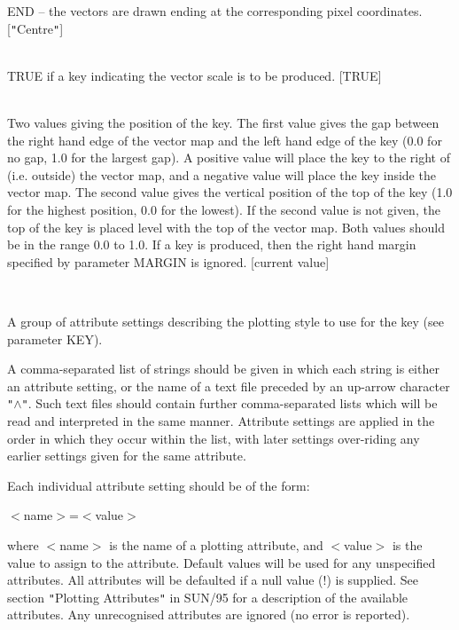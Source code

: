 \documentclass[twoside,11pt]{article}
\renewcommand{\_}{\texttt{\symbol{95}}}
\newcommand{\sstsubsection}[1]{ \item[{#1}] \mbox{} \\}
\newcommand{\sstitem}{\item}
\newcommand{\sstsubsection}[1]{\item[{#1}]}
\newcommand{\sstitem}{\item}
\begin{document}
{{{{            \sstitem
               END -- the vectors are drawn ending at the corresponding
               pixel coordinates.
            [{\tt "}Centre{\tt "}]
         }
      }
      \sstsubsection{
         KEY = \_LOGICAL (Read)
      }{
         TRUE if a key indicating the vector scale is to be produced. [TRUE]
      }
      \sstsubsection{
         KEYPOS() = \_REAL (Read)
      }{
         Two values giving the position of the key. The first value gives
         the gap between the right hand edge of the vector map and the left
         hand edge of the key (0.0 for no gap, 1.0 for the largest gap). A
         positive value will place the key to the right of (i.e. outside)
         the vector map, and a negative value will place the key inside
         the vector map. The second value gives the vertical position of the
         top of the key (1.0 for the highest position, 0.0 for the lowest).
         If the second value is not given, the top of the key is placed
         level with the top of the vector map. Both values should be in the
         range 0.0 to 1.0. If a key is produced, then the right hand margin
         specified by parameter MARGIN is ignored. [current value]
      }
      \sstsubsection{
         KEYSTYLE = GROUP (Read)
      }{
         A group of attribute settings describing the plotting style to use
         for the key (see parameter KEY).

         A comma-separated list of strings should be given in which each
         string is either an attribute setting, or the name of a text file
         preceded by an up-arrow character {\tt "}$\wedge${\tt "}. Such text files should
         contain further comma-separated lists which will be read and
         interpreted in the same manner. Attribute settings are applied in
         the order in which they occur within the list, with later settings
         over-riding any earlier settings given for the same attribute.

         Each individual attribute setting should be of the form:

            $<$name$>$=$<$value$>$

         where $<$name$>$ is the name of a plotting attribute, and $<$value$>$ is
         the value to assign to the attribute. Default values will be
         used for any unspecified attributes. All attributes will be
         defaulted if a null value (!) is supplied. See section {\tt "}Plotting
         Attributes{\tt "} in SUN/95 for a description of the available
         attributes. Any unrecognised attributes are ignored (no error is
         reported).

}}}
\end{document}
